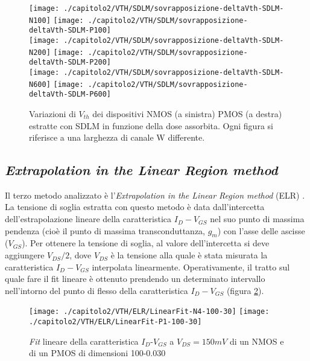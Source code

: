 \clearpage

\begin{figure}[ht]
  \centering
  \texttt{[image: ./capitolo2/VTH/SDLM/sovrapposizione-deltaVth-SDLM-N100]}
  \texttt{[image: ./capitolo2/VTH/SDLM/sovrapposizione-deltaVth-SDLM-P100]}\\
  \vspace{0.2cm}
  \texttt{[image: ./capitolo2/VTH/SDLM/sovrapposizione-deltaVth-SDLM-N200]}
  \texttt{[image: ./capitolo2/VTH/SDLM/sovrapposizione-deltaVth-SDLM-P200]}\\
  \vspace{0.2cm}
  \texttt{[image: ./capitolo2/VTH/SDLM/sovrapposizione-deltaVth-SDLM-N600]}
  \texttt{[image: ./capitolo2/VTH/SDLM/sovrapposizione-deltaVth-SDLM-P600]}
  \caption[Dati $\Delta V_{th}$ estratti con SDLM]{Variazioni di $V_{th}$ dei dispositivi NMOS (a sinistra) PMOS (a destra) estratte con SDLM in funzione della dose assorbita. Ogni figura si riferisce a una larghezza di canale W differente.}
  \label{fig:deltaVthSDLM}
\end{figure}

\FloatBarrier

\subsection[ELR]{\emph{Extrapolation in the Linear Region method}}
Il terzo metodo analizzato è l'\emph{Extrapolation in the Linear Region method} (ELR) \cite{art2}. La tensione di soglia estratta con questo metodo è data dall'intercetta dell'estrapolazione lineare della caratteristica $I_D-V_{GS}$ nel suo punto di massima pendenza (cioè il punto di massima transconduttanza, $g_m$) con l'asse delle ascisse ($V_{GS}$). Per ottenere la tensione di soglia, al valore dell'intercetta si deve aggiungere $V_{DS}/2$, dove $V_{DS}$ è la tensione alla quale è stata misurata la caratteristica $I_D-V_{GS}$ interpolata linearmente.
Operativamente, il tratto sul quale fare il fit lineare è ottenuto prendendo un determinato intervallo nell'intorno del punto di flesso della caratteristica $I_D-V_{GS}$ (figura \ref{fig:ELR_ESEMPIO}).

\begin{figure}[h!]
  \centering
  \texttt{[image: ./capitolo2/VTH/ELR/LinearFit-N4-100-30]}
  \texttt{[image: ./capitolo2/VTH/ELR/LinearFit-P1-100-30]}
  \caption[Applicazione ELR]{\emph{Fit} lineare della caratteristica  $I_D$-$V_{GS}$ a $V_{DS}=150mV$ di un NMOS e di un PMOS di dimensioni 100-0.030 }
  \label{fig:ELR_ESEMPIO}
\end{figure}

